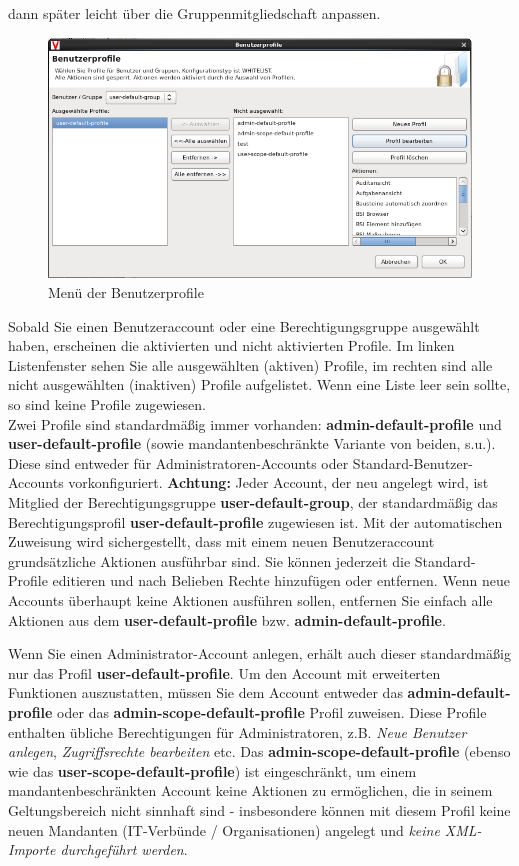 \documentclass[a4paper,10pt]{book}
\begin{document}
dann später leicht über die Gruppenmitgliedschaft anpassen.
\newline
\begin{figure}[htb!]
  \centering
  \includegraphics[scale=.45]{Screenshot/Benutzerprofile.png}
  \caption{\label{Menue der Benutzerprofile} Menü der Benutzerprofile}
\end{figure}
\newline
Sobald Sie einen Benutzeraccount oder eine Berechtigungsgruppe ausgewählt haben, erscheinen die aktivierten und nicht aktivierten Profile.
Im linken Listenfenster sehen Sie alle ausgewählten (aktiven) Profile, im rechten sind alle nicht ausgewählten (inaktiven) Profile aufgelistet.
Wenn eine Liste leer sein sollte, so sind keine Profile zugewiesen.
\newline\\
Zwei Profile sind standardmäßig immer vorhanden: \textbf{admin-default-profile} und \textbf{user-default-profile} (sowie mandantenbeschränkte
Variante von beiden, s.u.). Diese sind entweder für Administratoren-Accounts oder Standard-Benutzer-Accounts vorkonfiguriert. \textbf{Achtung:}
Jeder Account, der neu angelegt wird, ist Mitglied der Berechtigungsgruppe \textbf{user-default-group}, der standardmäßig das Berechtigungsprofil
\textbf{user-default-profile} zugewiesen ist. Mit der automatischen Zuweisung wird sichergestellt, dass mit einem neuen Benutzeraccount grundsätzliche
Aktionen ausführbar sind. Sie können jederzeit die Standard-Profile editieren und nach Belieben Rechte hinzufügen oder entfernen.
Wenn neue Accounts überhaupt keine Aktionen ausführen sollen, entfernen Sie einfach alle Aktionen aus dem \textbf{user-default-profile} bzw.
\textbf{admin-default-profile}.

Wenn Sie einen Administrator-Account anlegen, erhält auch dieser standardmäßig
nur das Profil \textbf{user-default-profile}. Um den Account mit erweiterten
Funktionen auszustatten, müssen Sie dem Account entweder das
\textbf{admin-default-profile} oder das \textbf{admin-scope-default-profile}
Profil zuweisen. Diese Profile enthalten übliche Berechtigungen für
Administratoren, z.B. \textit{Neue Benutzer anlegen}, \textit{Zugriffsrechte
bearbeiten} etc. Das \textbf{admin-scope-default-profile} (ebenso wie das
\textbf{user-scope-default-profile}) ist eingeschränkt, um einem
mandantenbeschränkten Account keine Aktionen zu ermöglichen, die in seinem
Geltungsbereich nicht sinnhaft sind - insbesondere können mit diesem Profil
keine neuen Mandanten (IT-Verbünde / Organisationen) angelegt und \textit{keine
XML-Importe durchgeführt werden}.
\end{document}
